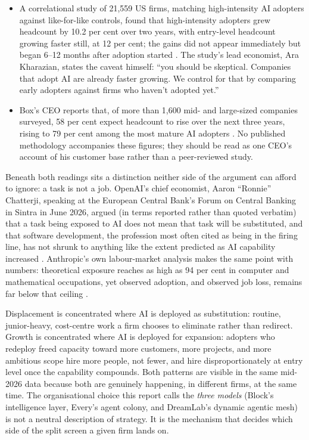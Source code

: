 \begin{evidencebox}[title={Expansion Side: Where Adopters Are Hiring More}]
\begin{itemize}
  \item A correlational study of 21,559 US firms, matching high-intensity AI adopters against like-for-like controls, found that high-intensity adopters grew headcount by 10.2 per cent over two years, with entry-level headcount growing faster still, at 12 per cent; the gains did not appear immediately but began 6--12 months after adoption started \parencite{RampRevelio2026}. The study's lead economist, Ara Kharazian, states the caveat himself: ``you should be skeptical. Companies that adopt AI are already faster growing. We control for that by comparing early adopters against firms who haven't adopted yet.''
  \item Box's CEO reports that, of more than 1,600 mid- and large-sized companies surveyed, 58 per cent expect headcount to rise over the next three years, rising to 79 per cent among the most mature AI adopters \parencite{Levie2026}. No published methodology accompanies these figures; they should be read as one CEO's account of his customer base rather than a peer-reviewed study.
\end{itemize}
\end{evidencebox}

Beneath both readings sits a distinction neither side of the argument can afford to ignore: a task is not a job. OpenAI's chief economist, Aaron ``Ronnie'' Chatterji, speaking at the European Central Bank's Forum on Central Banking in Sintra in June 2026, argued (in terms reported rather than quoted verbatim) that a task being exposed to AI does not mean that task will be substituted, and that software development, the profession most often cited as being in the firing line, has not shrunk to anything like the extent predicted as AI capability increased \parencite{Chatterji2026}. Anthropic's own labour-market analysis makes the same point with numbers: theoretical exposure reaches as high as 94 per cent in computer and mathematical occupations, yet observed adoption, and observed job loss, remains far below that ceiling \parencite{AnthropicLabor2026}.

\begin{keyinsight}[title={The Split Screen Is a Distribution, Not a Contradiction}]
Displacement is concentrated where AI is deployed as substitution: routine, junior-heavy, cost-centre work a firm chooses to eliminate rather than redirect. Growth is concentrated where AI is deployed for expansion: adopters who redeploy freed capacity toward more customers, more projects, and more ambitious scope hire more people, not fewer, and hire disproportionately at entry level once the capability compounds. Both patterns are visible in the same mid-2026 data because both are genuinely happening, in different firms, at the same time. The organisational choice this report calls the \emph{three models} (Block's intelligence layer, Every's agent colony, and DreamLab's dynamic agentic mesh) is not a neutral description of strategy. It is the mechanism that decides which side of the split screen a given firm lands on.
\end{keyinsight}

